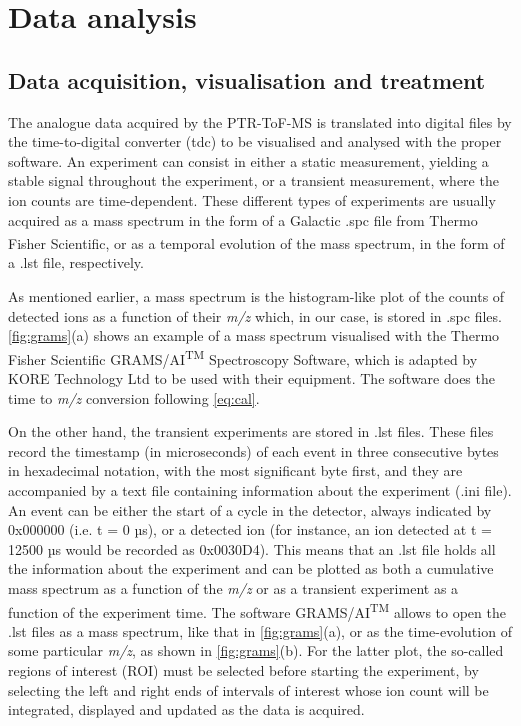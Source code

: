\section{Data analysis}







\subsection{Data acquisition, visualisation and treatment}

The analogue data acquired by the PTR-ToF-MS is translated into digital files by the time-to-digital converter (\acrshort{tdc}) to be visualised and analysed  with the proper software. An experiment can consist in either a static measurement, yielding a stable signal throughout the experiment, or a transient measurement, where the ion counts are time-dependent. These different types of experiments are usually acquired as a mass spectrum  in the form of a Galactic .spc  file from Thermo Fisher Scientific\textsuperscript{\textregistered}, or as a temporal evolution of the mass spectrum, in the form of a .lst file, respectively.

As mentioned earlier, a mass spectrum is the histogram-like plot of the counts of detected ions as a function of their \textit{m/z} which, in our case, is stored in .spc files.
\autoref{fig:grams}(a) shows an example of a mass spectrum visualised with the Thermo Fisher Scientific\textsuperscript{\textregistered}  GRAMS/AI\textsuperscript{TM}  Spectroscopy Software, which is adapted by KORE Technology Ltd to be used with their equipment.
The software does the time to \textit{m/z} conversion following \autoref{eq:cal}.


On the other hand, the transient experiments are stored in %
.lst files.
 These %
 files  record the timestamp (in microseconds) of each event in three consecutive bytes in hexadecimal notation, with the most significant byte first, and they are accompanied by a text file containing information about the experiment (.ini file).
An event can be either the start of a cycle in the detector, always indicated by 0x000000 (i.e. t = 0 µs), or a detected ion (for instance, an ion detected at t = 12500 µs would be recorded as 0x0030D4).
 This means that an .lst file holds all the information about the experiment and can be plotted as both a cumulative mass spectrum as a function of the \textit{m/z} or as a transient experiment as a function of the experiment time.
The software GRAMS/AI\textsuperscript{TM} allows to open the .lst files as a mass spectrum, like that in \autoref{fig:grams}(a), or as the time-evolution of some particular \textit{m/z}, as shown in \autoref{fig:grams}(b). For the latter plot, the so-called regions of interest (ROI) must be selected before starting the experiment, by selecting the left and right ends of intervals of interest whose ion count will be integrated, displayed and updated as the data is acquired.

